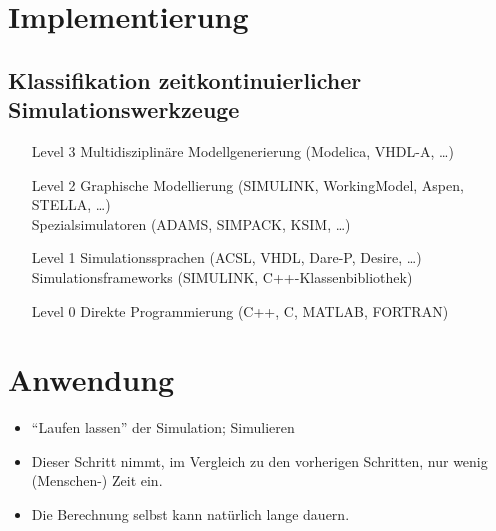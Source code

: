 
    \section{Implementierung} %
        \label{sec:simimpl}
    
        \subsection{Klassifikation zeitkontinuierlicher Simulationswerkzeuge} %
            \begin{itemize}
            	\item[Level 3] Multidisziplinäre Modellgenerierung (Modelica, VHDL-A, \dots)
            	\item[Level 2] Graphische Modellierung (SIMULINK, WorkingModel, Aspen, STELLA, \dots) \\
				               Spezialsimulatoren (ADAMS, SIMPACK, KSIM, \dots)
	            \item[Level 1] Simulationssprachen (ACSL, VHDL, Dare-P, Desire, \dots) \\
					           Simulationsframeworks (SIMULINK, C++-Klassenbibliothek)
		        \item[Level 0] Direkte Programmierung (C++, C, MATLAB, FORTRAN)
            \end{itemize}

    \section{Anwendung} %
        \label{sec:simanwendung}
    
        \begin{itemize}
        	\item \enquote{Laufen lassen} der Simulation; Simulieren
        	\item Dieser Schritt nimmt, im Vergleich zu den vorherigen Schritten, nur wenig (Menschen-) Zeit ein.
        	\item Die Berechnung selbst kann natürlich lange dauern.
        \end{itemize}

